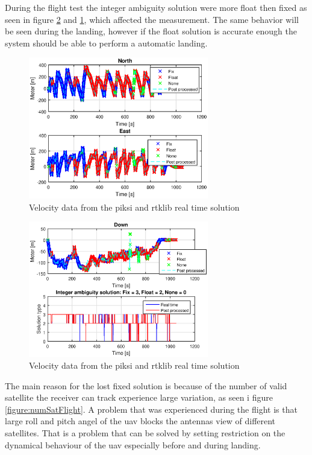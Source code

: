 During the flight test the integer ambiguity solution were more float then fixed as seen in figure \ref{figure:DownFlight} and \ref{figure:northEastFlight}, which affected the measurement. The same behavior will be seen during the landing, however if the float solution is accurate enough the system should be able to perform a automatic landing.
\begin{figure}[H]
	\centering
		\includegraphics[width=0.7\textwidth]{figs/plots/northEastFlight.eps}
		\caption{Velocity data from the piksi and rtklib real time solution}
		\label{figure:northEastFlight}
\end{figure}
\begin{figure}[H]
	\centering
		\includegraphics[width=0.7\textwidth]{figs/plots/downFlight.eps}
		\caption{Velocity data from the piksi and rtklib real time solution}
		\label{figure:DownFlight}
\end{figure}
The main reason for the lost fixed solution is because of the number of valid satellite the receiver can track experience large variation, as seen i figure \ref{figure:numSatFlight}. A problem that was experienced during the flight is that large roll and pitch angel of the \gls{uav} blocks the antennas view of different satellites. That is a problem that can be solved by setting restriction on the dynamical behaviour of the \gls{uav} especially before and during landing.
